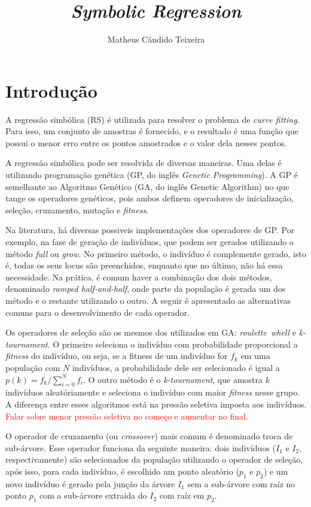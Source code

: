\documentclass[a4paper]{paper}
\begin{document}
\title{{\itshape Symbolic Regression}}
\author{Matheus Cândido Teixeira}
\maketitle

\section{Introdução}
A regressão simbólica (RS) é utilizada para resolver o problema de \emph{curve
fitting}. Para isso, um conjunto de amostras é fornecido, e o resultado é uma
função que possui o menor erro entre os pontos amostrados e o valor dela nesses
pontos.

A regressão simbólica pode ser resolvida de diversas maneiras. Uma delas é
utilizando programação genética (GP, do inglês \textit{Genetic Programming}).  A
GP é semelhante ao Algoritmo Genético (GA, do inglês Genetic Algorithm) no que
tange os operadores genéticos, pois ambos definem operadores de inicialização,
seleção, cruzamento, mutação e \textit{fitness}.

Na literatura, há diversas possiveis implementações dos operadores de GP. Por
exemplo, na fase de geração de indivíduos, que podem ser gerados utilizando o
método \textit{full} ou \textit{grow}. No primeiro método, o indivíduo é
complemente gerado, isto é, todas os seus locus são preenchidos, enquanto que
no último, não há essa necessidade. Na prática, é comum haver a combinação dos
dois métodos, denominado \textit{ramped half-and-half}, onde parte da população
é gerada um dos método e o restante utilizando o outro. A seguir é apresentado
as alternativas comuns para o desenvolvimento de cada operador.

Os operadores de seleção são os mesmos dos utilizados em GA:
\textit{roulette~whell} e \textit{k-tournament}. O primeiro seleciona o
indivíduo com probabilidade proporcional a \textit{fitness} do indivíduo, ou
seja, se a fitness de um indivíduo for \emph{$f_k$} em uma população com $N$
indivíduos, a probabilidade dele ser selecionado é igual a $p(k) =
f_k/\sum_{i=0}^{N}f_i$. O outro método é o \textit{k-tournament}, que amostra
$k$ indivíduos aleatóriamente e seleciona o indivíduo com maior \textit{fitness}
nesse grupo. A diferença entre esses algoritmos está na pressão seletiva imposta
aos indivíduos. \textcolor{red}{Falar sobre menor pressão seletiva no começo e
  aumentar no final}.

O operador de cruzamento (ou \textit{crossover}) mais comum é denominado troca
de sub-árvore. Esse operador funciona da seguinte maneira: dois indivíduos
($I_1$ e $I_2$, respectivamente) são selecionados da população utilizando o
operador de seleção, após isso, para cada indivíduo, é escolhido um ponto
aleatório ($p_1$ e $p_2$) e um novo indivíduo é gerado pela junção da árvore
$I_1$ sem a sub-árvore com raíz no ponto $p_1$ com a sub-árvore extraida do
$I_2$ com raíz em $p_2$.
\end{document}
